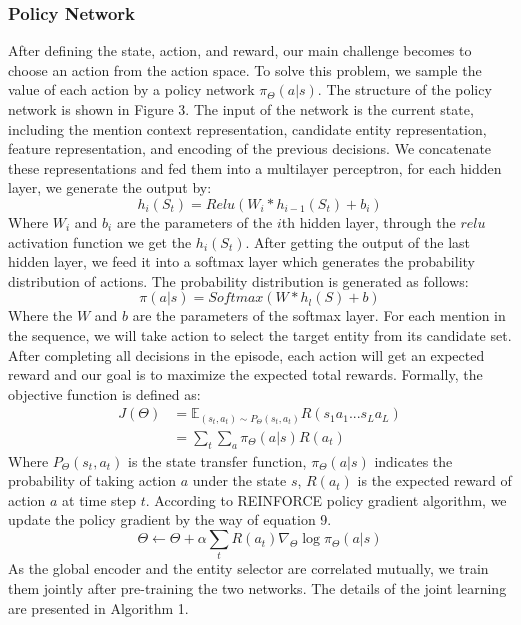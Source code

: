 \documentclass[sigconf]{acmart}
\begin{document}
\subsubsection*{Policy Network}
After defining the state, action, and reward, our main challenge becomes to choose an action from the action space. To solve this problem, we sample the value of each action by a policy network $\pi_{\Theta}(a|s)$. The structure of the policy network is shown in Figure 3. The input of the network is the current state, including the mention context representation, candidate entity representation, feature representation, and encoding of the previous decisions. We concatenate these representations and fed them into a multilayer perceptron, for each hidden layer, we generate the output by:
\begin{equation}       
h_i(S_t) = Relu(W_i*h_{i-1}(S_t) + b_i)
\end{equation}
Where $W_i$ and $ b_i$ are the parameters of the $i$th hidden layer, through the $relu$ activation function we get the $h_i(S_t)$. After getting the output of the last hidden layer, we feed it into a softmax layer which generates the probability distribution of actions. The probability distribution is generated as follows:
\begin{equation}       
\pi(a|s) = Softmax(W * h_l(S) + b)
\end{equation}
Where the $W$ and $b$ are the parameters of the softmax layer. For each mention in the sequence, we will take action to select the target entity from its candidate set. After completing all decisions in the episode, each action will get an expected reward and our goal is to maximize the expected total rewards. Formally, the objective function is defined as:
\begin{equation} 
\begin{split}      
J(\Theta) &= \mathbb{E}_{(s_t, a_t){\sim}P_\Theta{(s_t, a_t)}}R(s_1{a_1}...s_L{a_L}) \\
&=\sum_{t}\sum_{a}\pi_{\Theta}(a|s)R(a_t)
\end{split}
\end{equation}
Where $P_\Theta{(s_t, a_t)}$ is the state transfer function, $\pi_{\Theta}(a|s)$ indicates the probability of taking action $a$ under the state $s$, $R(a_t)$ is the expected reward of action $a$ at time step $t$. According to REINFORCE policy gradient algorithm\cite{Williams92}, we update the policy gradient by the way of equation 9. 
\begin{equation}
\Theta \leftarrow \Theta + \alpha \sum_{t}R(a_t)\nabla_{\Theta}\log\pi_{\Theta}(a|s)
\end{equation}
As the global encoder and the entity selector are correlated mutually, we train them jointly after pre-training the two networks. The details of the joint learning are presented in Algorithm 1.
 
\end{document}
